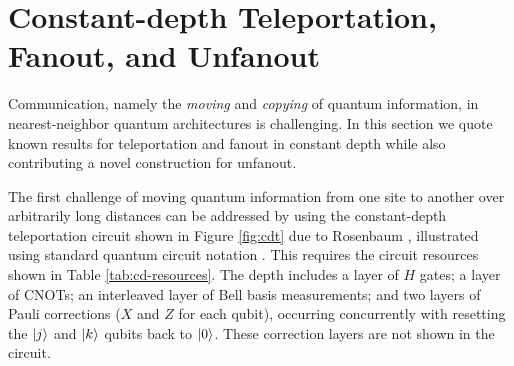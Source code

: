 \section{Constant-depth Teleportation, Fanout, and Unfanout}
\label{sec:cdc}

Communication, namely the \emph{moving} and \emph{copying} of quantum information, in nearest-neighbor quantum architectures is challenging.
In this section we quote known results for teleportation and
fanout in constant depth while also contributing a novel construction
for unfanout.

The first challenge of moving quantum information from one site to another over
arbitrarily long distances can be addressed by using
the constant-depth teleportation circuit
shown in Figure \ref{fig:cdt} due to Rosenbaum \cite{Rosenbaum2012}, illustrated using standard quantum circuit
notation \cite{Nielsen2000}. This requires the circuit resources shown in
Table \ref{tab:cd-resources}. The depth includes a layer of $H$ gates; a layer of CNOTs; an interleaved layer of Bell basis measurements; and two layers of
Pauli corrections ($X$ and $Z$ for each qubit), occurring concurrently with
resetting the $\left\vert{j}\right\rangle$ and $\left\vert{k}\right\rangle$ qubits back to $\left\vert{0}\right\rangle$.
These correction layers are not shown in the circuit.

